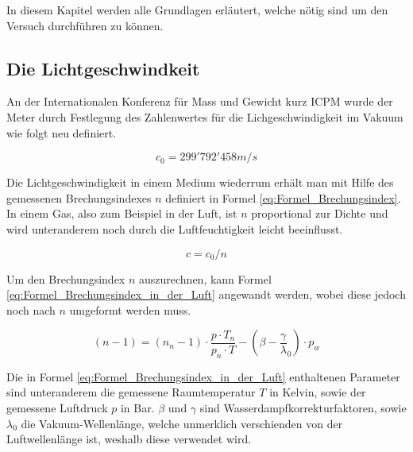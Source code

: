 In diesem Kapitel werden alle Grundlagen erläutert, welche nötig sind um den Versuch durchführen zu können. 

\subsection{Die Lichtgeschwindkeit}

An der Internationalen Konferenz für Mass und Gewicht kurz ICPM wurde der Meter durch Festlegung des Zahlenwertes für die Lichgeschwindigkeit im Vakuum wie folgt neu definiert.

\begin{equation*}
c_{0} = 299'792'458 m/s
\label{eq:Lichtgeschwindigkeit}
\end{equation*}

Die Lichtgeschwindigkeit in einem Medium wiederrum erhält man mit Hilfe des gemessenen Brechungsindexes $n$ definiert in Formel \ref{eq:Formel_Brechungsindex}. In einem Gas, also zum Beispiel in der Luft, ist $n$ proportional zur Dichte und wird unteranderem noch durch die Luftfeuchtigkeit leicht beeinflusst.

\begin{equation}
c=c_{0}/n
\label{eq:Formel_Brechungsindex}
\end{equation}

Um den Brechungsindex $n$ auszurechnen, kann Formel \ref{eq:Formel_Brechungsindex_in_der_Luft} angewandt werden, wobei diese jedoch noch nach $n$ umgeformt werden muss.

\begin{equation}
(n - 1) = (n_{n} - 1)\cdot\dfrac{p \cdot T_{n}}{p_{n} \cdot T}-(\beta - \dfrac{\gamma}{\lambda}_{0}) \cdot p_{w}
\label{eq:Formel_Brechungsindex_in_der_Luft}
\end{equation}

Die in Formel \ref{eq:Formel_Brechungsindex_in_der_Luft} enthaltenen Parameter sind unteranderem die gemessene Raumtemperatur $T$ in Kelvin, sowie der gemessene Luftdruck $p$ in Bar. $\beta$ und $\gamma$ sind Wasserdampfkorrekturfaktoren, sowie $\lambda_{0}$ die Vakuum-Wellenlänge, welche unmerklich verschienden von der Luftwellenlänge ist, weshalb diese verwendet wird.

